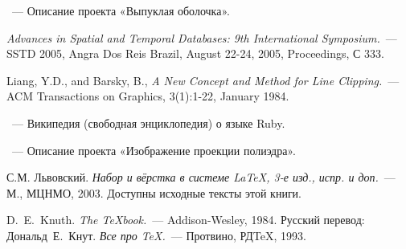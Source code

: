 \begin{thebibliography}{}

~---
Описание проекта «Выпуклая оболочка».

{\em Advances in Spatial and Temporal Databases: 9th International Symposium.}~---
SSTD 2005, Angra Dos Reis Brazil, August 22-24, 2005, Proceedings, С 333.

Liang, Y.D., and Barsky, B., {\em A New Concept and Method for Line Clipping.}~---
ACM Transactions on Graphics, 3(1):1-22, January 1984.

~---
Википедия (свободная энциклопедия) о языке Ruby.

~---
Описание проекта «Изображение проекции полиэдра».

С.М. Львовский.
{\em Набор и вёрстка в системе \LaTeX, 3-е изд., испр. и доп.}~---
М., МЦНМО, 2003. Доступны исходные тексты этой книги.

D.~E.~Knuth. {\em The \TeX{}book.}~---
Addison-Wesley, 1984. Русский перевод:
Дональд~Е.~Кнут.
{\em Все про \TeX.}~--- Протвино, РД\TeX, 1993.

\end{thebibliography}
